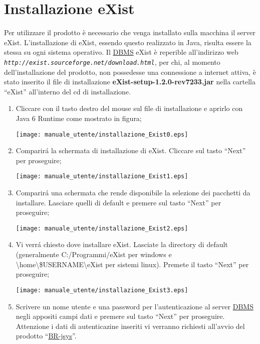 \section{Installazione eXist}
Per utilizzare il prodotto \`e necessario che venga installato sulla macchina il server eXist. L'installazione di eXist, essendo questo realizzato in Java, risulta essere la stessa su ogni sistema operativo.
Il \underline{DBMS} eXist \`e reperible all'indirizzo web \textit{\texttt{http://exist.sourceforge.net/download.html}}, per chi, al momento dell'installazione del prodotto, non possedesse una connessione a internet attiva, \`e stato inserito il file di installazione \textbf{eXist-setup-1.2.0-rev7233.jar} nella cartella ``eXist'' all'interno del cd di installazione.
\begin{enumerate}
\item Cliccare con il tasto destro del mouse sul file di installazione e aprirlo con Java 6 Runtime come mostrato in figura;
\begin{center}
\texttt{[image: manuale\_utente/installazione\_Exist0.eps]}\\
\end{center}
\item Comparir\'a la schermata di installazione di eXist. Cliccare sul tasto ``Next'' per proseguire;
\begin{center}
\texttt{[image: manuale\_utente/installazione\_Exist1.eps]}\\
\end{center}
\item Comparir\'a una schermata che rende disponibile la selezione dei pacchetti da installare. Lasciare quelli  di default e premere sul tasto ``Next'' per proseguire;
\begin{center}
\texttt{[image: manuale\_utente/installazione\_Exist2.eps]}\\
\end{center}
\item Vi verr\'a chiesto dove installare eXist. Lasciate la directory di default (generalmente C:/Programmi/eXist per windows e \textbackslash home\textbackslash \$USERNAME\textbackslash eXist per sistemi linux). Premete il tasto ``Next'' per proseguire;
\begin{center}
\texttt{[image: manuale\_utente/installazione\_Exist3.eps]}\\
\end{center}
\item Scrivere un nome utente e una password per l'autenticazione al server \underline{DBMS} negli appositi campi dati e premere sul tasto ``Next'' per proseguire. Attenzione i dati di autenticazine inseriti vi verranno richiesti all'avvio del prodotto ``\underline{BR-jsys}''.

\end{enumerate}
